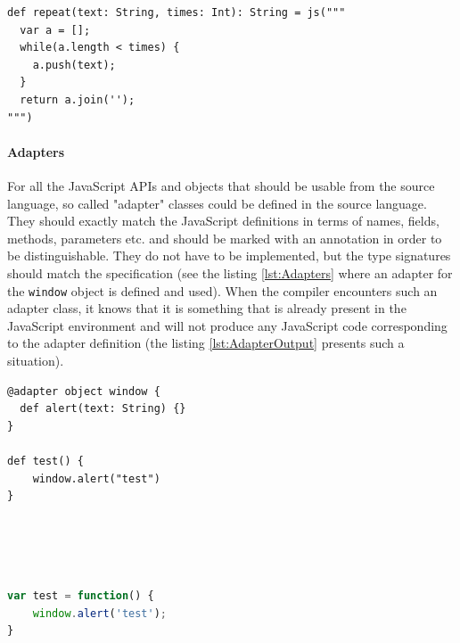 \documentclass[12pt,a4paper]{report}
\begin{document}
\begin{minipage}{\linewidth}
\begin{lstlisting}[caption={Native code block example.},label={lst:NativeCodeBlock}]
def repeat(text: String, times: Int): String = js("""
  var a = [];
  while(a.length < times) {
    a.push(text);
  }
  return a.join('');
""")
\end{lstlisting}
\end{minipage}

\paragraph{Adapters} For all the JavaScript APIs and objects that should be usable from the source language, so called "adapter" classes could be defined in the source language. They should exactly match the JavaScript definitions in terms of names, fields, methods, parameters etc. and should be marked with an annotation in order to be distinguishable. They do not have to be implemented, but the type signatures should match the specification (see the listing \ref{lst:Adapters} where an adapter for the \texttt{window} object is defined and used). When the compiler encounters such an adapter class, it knows that it is something that is already present in the JavaScript environment and will not produce any JavaScript code corresponding to the adapter definition (the listing \ref{lst:AdapterOutput} presents such a situation).

\begin{center}
\begin{minipage}{.48\textwidth}
  \begin{lstlisting}[caption={Adapter definition and usage example.},label={lst:Adapters}]
@adapter object window {
  def alert(text: String) {}
}

def test() {
	window.alert("test")
}
  \end{lstlisting}
\end{minipage}
\hfill
\begin{minipage}{.48\textwidth}
  \begin{lstlisting}[language=JavaScript,caption={Adapter compilation output.},label={lst:AdapterOutput}]
	
	
	
	
var test = function() {
	window.alert('test');
}
  \end{lstlisting}
\end{minipage}
\end{center}
\end{document}
